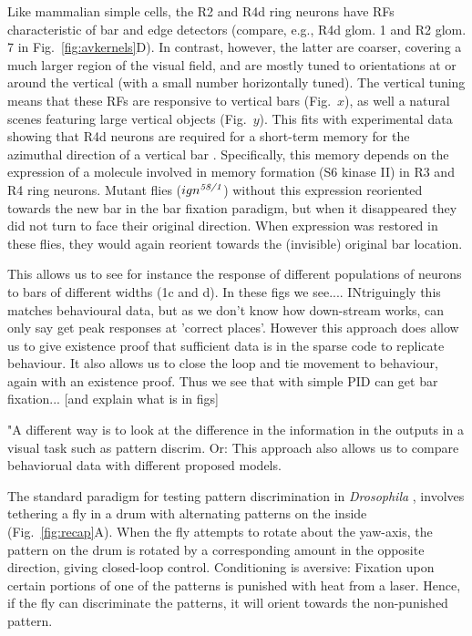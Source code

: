 Like mammalian simple cells, the R2 and R4d ring neurons have RFs characteristic of bar and edge detectors (compare, e.g., R4d glom. 1 and R2 glom. 7 in Fig.~\ref{fig:avkernels}D).
In contrast, however, the latter are coarser, covering a much larger region of the visual field, and are mostly tuned to orientations at or around the vertical (with a small number horizontally tuned).
The vertical tuning means that these RFs are responsive to vertical bars (Fig.~$x$), as well a natural scenes featuring large vertical objects (Fig.~$y$).
This fits with experimental data showing that R4d neurons are required for a short-term memory for the azimuthal direction of a vertical bar \cite{Neuser2008}.
Specifically, this memory depends on the expression of a molecule involved in memory formation (S6 kinase II) in R3 and R4 ring neurons.
Mutant flies ($ign^{\emph{58/1}}$) without this expression reoriented towards the new bar in the bar fixation paradigm, but when it disappeared they did not turn to face their original direction.
When expression was restored in these flies, they would again reorient towards the (invisible) original bar location.

This allows us to see for instance the response of different populations of neurons to bars of different widths (1c and d). In these figs we see.... INtriguingly this matches behavioural data, 
but as we don't know how down-stream works, can only say get peak responses at 'correct places'. However this approach does allow us to give existence proof that 
sufficient data is in the sparse code to replicate behaviour. It also allows us to close the loop and tie movement to behaviour, again with an existence proof. 
Thus we see that with simple PID can get bar fixation... [and explain what is in figs]

"A different way is to look at the difference in the information in the outputs in a visual task such as pattern discrim. Or: This approach also allows us to compare behaviorual data 
with different proposed models.

The standard paradigm for testing pattern discrimination in \emph{Drosophila} \cite{Pan2009,Liu2006,Ernst1999,Dill1993}, involves tethering a fly in a drum with alternating patterns on the inside (Fig.~\ref{fig:recap}A).
When the fly attempts to rotate about the yaw-axis, the pattern on the drum is rotated by a corresponding amount in the opposite direction, giving closed-loop control.
Conditioning is aversive: Fixation upon certain portions of one of the patterns is punished with heat from a laser.
Hence, if the fly can discriminate the patterns, it will orient towards the non-punished pattern. 


